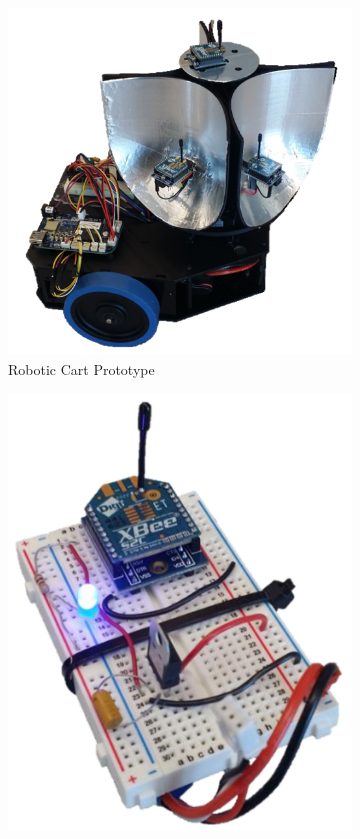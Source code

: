 \begin{figure}[H]
    \centering
    \begin{subfigure}[t]{0.5\textwidth}
        \centering
        \includegraphics[width=\textwidth]{figs/img/Finalized_robot.png}
        \captionsetup{width=\textwidth}
        \caption{Robotic Cart Prototype}
        \label{fig:overallPrototype}
    \end{subfigure}
    \begin{subfigure}[t]{0.35\textwidth}
        \centering
        \includegraphics[width=\textwidth]{figs/remote.pdf}

\end{subfigure}
\end{figure}
